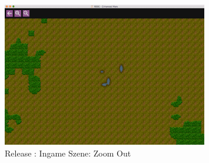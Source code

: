 \documentclass[12pt, titlepage]{scrartcl}
\newcommand{\RN}[1]{%
	\textup{\uppercase\expandafter{\romannumeral#1}}%
}
\begin{document}
			    \begin{figure}[H] 
    				\centering
    				\includegraphics[width=0.8\textwidth]{images/old_state/ingame/ZoomOut.png}
    				\caption{Release \RN{2}: Ingame Szene: Zoom Out}
    				\label{Ingame_Out}
			    \end{figure}
	\newpage
\end{document}
